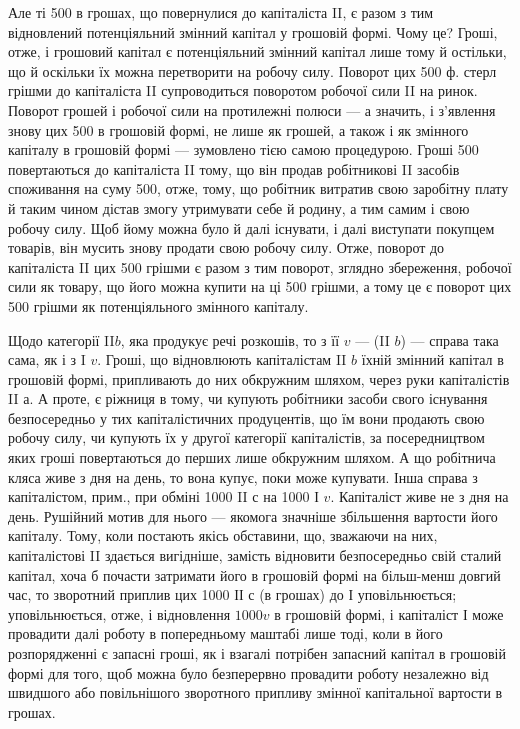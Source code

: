 
Але ті 500 в грошах, що повернулися до капіталіста II, є разом з
тим відновлений потенціяльний змінний капітал у грошовій формі. Чому
це? Гроші, отже, і грошовий капітал є потенціяльний змінний капітал
лише тому й остільки, що й оскільки їх можна перетворити на робочу
силу. Поворот цих 500 ф. стерл грішми до капіталіста II супроводиться
поворотом робочої сили II на ринок. Поворот грошей і робочої сили на
протилежні полюси — а значить, і з’явлення знову цих 500 в грошовій
формі, не лише як грошей, а також і як змінного капіталу в грошовій
формі — зумовлено тією самою процедурою. Гроші \deq{} 500 повертаються до
капіталіста II тому, що він продав робітникові II засобів споживання на
суму 500, отже, тому, що робітник витратив свою заробітну плату й таким
чином дістав змогу утримувати себе й родину, а тим самим і свою
робочу силу. Щоб йому можна було й далі існувати, і далі виступати
покупцем товарів, він мусить знову продати свою робочу силу. Отже,
поворот до капіталіста II цих 500 грішми є разом з тим поворот, зглядно
збереження, робочої сили як товару, що його можна купити на ці 500
грішми, а тому це є поворот цих 500 грішми як потенціяльного змінного
капіталу.

Щодо категорії II$b$, яка продукує речі розкошів, то з її $v$ —
(II $b$) — справа така сама, як і з I $v$. Гроші, що відновлюють капіталістам
II $b$ їхній змінний капітал в грошовій формі, припливають до них
обкружним шляхом, через руки капіталістів II $а$. А проте, є ріжниця в
тому, чи купують робітники засоби свого існування безпосередньо у тих
капіталістичних продуцентів, що їм вони продають свою робочу силу, чи
купують їх у другої категорії капіталістів, за посередництвом яких гроші
повертаються до перших лише обкружним шляхом. А що робітнича кляса
живе з дня на день, то вона купує, поки може купувати. Інша справа
з капіталістом, прим., при обміні 1000 II $с$ на 1000 І $v$. Капіталіст живе
не з дня на день. Рушійний мотив для нього — якомога значніше збільшення
вартости його капіталу. Тому, коли постають якісь обставини, що,
зважаючи на них, капіталістові II здається вигідніше, замість відновити
безпосередньо свій сталий капітал, хоча б почасти затримати його в
грошовій формі на більш-менш довгий час, то зворотний приплив цих
1000 ІІ $с$ (в грошах) до І уповільнюється; уповільнюється, отже, і відновлення
$1000 v$ в грошовій формі, і капіталіст І може провадити далі
роботу в попередньому маштабі лише тоді, коли в його розпорядженні
є запасні гроші, як і взагалі потрібен запасний капітал в грошовій формі
для того, щоб можна було безперервно провадити роботу незалежно від
швидшого або повільнішого зворотного припливу змінної капітальної вартости
в грошах.

